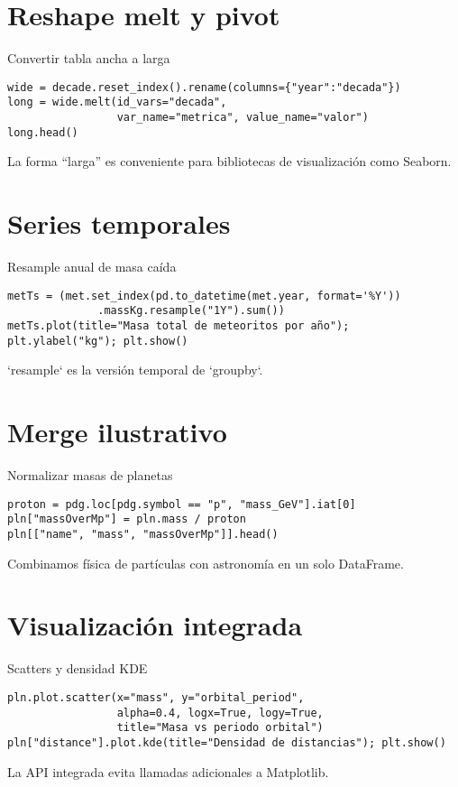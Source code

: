 \documentclass[10pt]{beamer}
\begin{document}
\section{Reshape melt y pivot}
\begin{frame}[fragile]{Convertir tabla ancha a larga}
\begin{verbatim}
wide = decade.reset_index().rename(columns={"year":"decada"})
long = wide.melt(id_vars="decada",
                 var_name="metrica", value_name="valor")
long.head()
\end{verbatim}
La forma “larga” es conveniente para bibliotecas de visualización como Seaborn.
\end{frame}

\section{Series temporales}
\begin{frame}[fragile]{Resample anual de masa caída}
\begin{verbatim}
metTs = (met.set_index(pd.to_datetime(met.year, format='%Y'))
              .massKg.resample("1Y").sum())
metTs.plot(title="Masa total de meteoritos por año"); plt.ylabel("kg"); plt.show()
\end{verbatim}
`resample` es la versión temporal de `groupby`.
\end{frame}

\section{Merge ilustrativo}
\begin{frame}[fragile]{Normalizar masas de planetas}
\begin{verbatim}
proton = pdg.loc[pdg.symbol == "p", "mass_GeV"].iat[0]
pln["massOverMp"] = pln.mass / proton
pln[["name", "mass", "massOverMp"]].head()
\end{verbatim}
Combinamos física de partículas con astronomía en un solo DataFrame.
\end{frame}

\section{Visualización integrada}
\begin{frame}[fragile]{Scatters y densidad KDE}
\begin{verbatim}
pln.plot.scatter(x="mass", y="orbital_period",
                 alpha=0.4, logx=True, logy=True,
                 title="Masa vs periodo orbital")
pln["distance"].plot.kde(title="Densidad de distancias"); plt.show()
\end{verbatim}
La API integrada evita llamadas adicionales a Matplotlib.
\end{frame}
\end{document}
